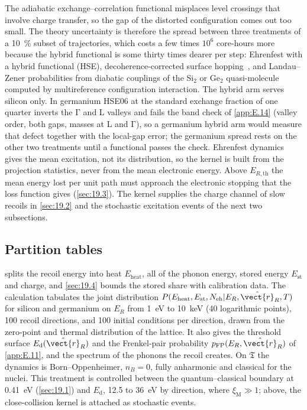 The adiabatic exchange--correlation functional misplaces level crossings that involve charge transfer, so the gap of the distorted configuration comes out too small. The theory uncertainty is therefore the spread between three treatments of a \SI{10}{\percent} subset of trajectories, which costs a few times $10^6$ core-hours more because the hybrid functional is some thirty times dearer per step: Ehrenfest with a hybrid functional (HSE), decoherence-corrected surface hopping~\cite{tully1990molecular}, and Landau--Zener probabilities from diabatic couplings of the Si$_2$ or Ge$_2$ quasi-molecule computed by multireference configuration interaction. The hybrid arm serves silicon only. In germanium HSE06 at the standard exchange fraction of one quarter inverts the $\mathrm{\Gamma}$ and L valleys and fails the band check of \cref{app:E.14} (valley order, both gaps, masses at L and $\mathrm{\Gamma}$), so a germanium hybrid arm would measure that defect together with the local-gap error; the germanium spread rests on the other two treatments until a functional passes the check. Ehrenfest dynamics gives the mean excitation, not its distribution, so the kernel is built from the projection statistics, never from the mean electronic energy. Above $E_{R,\mathrm{th}}$ the mean energy lost per unit path must approach the electronic stopping that the loss function gives (\cref{sec:19.3}). The kernel supplies the charge channel of slow recoils in \cref{sec:19.2} and the stochastic excitation events of the next two subsections.

\subsection{Partition tables}

 splits the recoil energy into heat $E_{\mathrm{heat}}$, all of the phonon energy, stored energy $E_{\mathrm{st}}$ and charge, and \cref{sec:19.4} bounds the stored share with calibration data. The calculation tabulates the joint distribution $P(E_{\mathrm{heat}}, E_{\mathrm{st}}, N_{\mathrm{eh}}|E_R, \hat{\vect{r}}_R, T)$ for silicon and germanium on $E_R$ from \SI{1}{eV} to \SI{10}{keV} (40 logarithmic points), 100 recoil directions, and 100 initial conditions per direction, drawn from the zero-point and thermal distribution of the lattice. It also gives the threshold surface $E_{\mathrm{d}}(\hat{\vect{r}}_R)$ and the Frenkel-pair probability $p_{\mathrm{FP}}(E_R, \hat{\vect{r}}_R)$ of \cref{app:E.11}, and the spectrum of the phonons the recoil creates. On $\mathfrak{T}$ the dynamics is Born--Oppenheimer, $n_B = 0$, fully anharmonic and classical for the nuclei. This treatment is controlled between the quantum--classical boundary at \SI{0.41}{eV} (\cref{sec:19.1}) and $E_{\mathrm{d}}$, 12.5 to \SI{36}{eV} by direction, where $\xi_{\mathrm{M}} \gg 1$; above, the close-collision kernel is attached as stochastic events.

